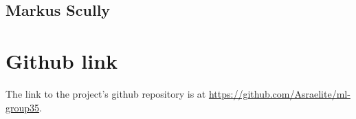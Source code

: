 \documentclass[transmag]{IEEEtran}
\begin{document}
\subsection{Markus Scully}

\section{Github link}
\noindent The link to the project's github repository is at \url{https://github.com/Asraelite/ml-group35}.








\end{document}
